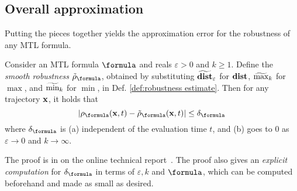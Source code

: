 \subsection{Overall approximation}
\label{sec:overall apx}
Putting the pieces together yields the approximation error for the robustness of any MTL formula.
\begin{theorem}
	\label{thm:total apx error}
	Consider an MTL formula $\formula$ and reals $\varepsilon > 0$ and $k \geq 1$. 
	Define the \textit{smooth robustness} $\srobf$, obtained by substituting $\widetilde{\mathbf{dist}}_{\varepsilon}$ for $\mathbf{dist}$, $\widetilde{\max}_k$ for $\max$, and $\widetilde{\min}_k$ for $\min$, in Def. \ref{def:robustness estimate}.
	Then for any trajectory $\mathbf{x}$, it holds that
	\[|\robf(\sstraj,t)-\srobf(\sstraj,t)| \leq \delta_\formula\]
	where $\delta_\formula$ is
	(a) independent of the evaluation time $t$, and 
	(b) goes to 0 as $\varepsilon \rightarrow 0$ and $k \rightarrow \infty$.
\end{theorem}
The proof is in on the online technical report~\cite{PantAM17_SmoothOpTechRpt}.
The proof also gives an \textit{explicit computation} for $\delta_\formula$ in terms of $\varepsilon, k$ and $\formula$, which can be computed beforehand and made as small as desired.
